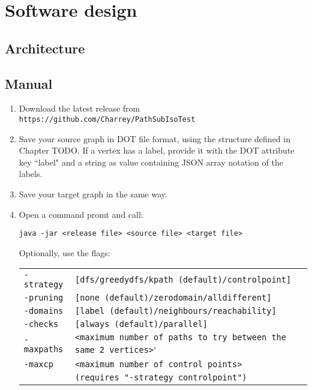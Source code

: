 \chapter{Software design}
\section{Architecture}


\section{Manual}
\begin{enumerate}[label=Step \arabic* : ]
\item Download the latest release from \texttt{https://github.com/Charrey/PathSubIsoTest}
\item Save your source graph in DOT file format, using the structure defined in Chapter TODO. If a vertex has a label, provide it with the DOT attribute key ``label" and a string as value containing JSON array notation of the labels.
\item Save your target graph in the same way.
\item Open a command promt and call:

\texttt{java -jar <release file> <source file> <target file>}

Optionally, use the flags:

\begin{tabular}{ll}
\texttt{-strategy}&\texttt{[dfs/greedydfs/kpath (default)/controlpoint]}\\
\texttt{-pruning}&\texttt{[none (default)/zerodomain/alldifferent]}\\
\texttt{-domains}&\texttt{[label (default)/neighbours/reachability]}\\
\texttt{-checks}&\texttt{[always (default)/parallel]}\\
\texttt{-maxpaths} & \texttt{<maximum number of paths to try between the same 2 vertices>}`\\
\texttt{-maxcp} & \texttt{<maximum number of control points>}\\
&\texttt{(requires "-strategy controlpoint")}
\end{tabular}
\end{enumerate}
